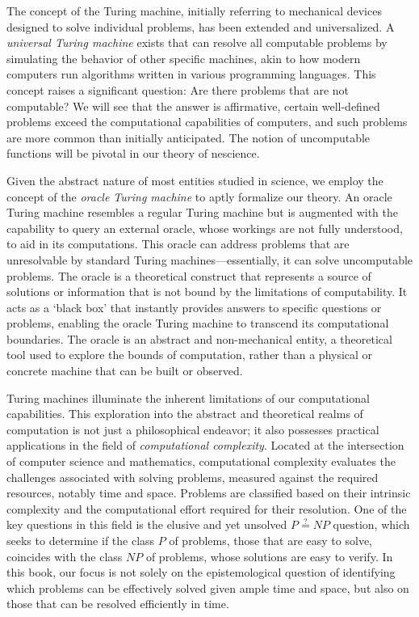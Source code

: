 The concept of the Turing machine, initially referring to mechanical devices designed to solve individual problems, has been extended and universalized. A \emph{universal Turing machine} exists that can resolve all computable problems by simulating the behavior of other specific machines, akin to how modern computers run algorithms written in various programming languages. This concept raises a significant question: Are there problems that are not computable? We will see that the answer is affirmative, certain well-defined problems exceed the computational capabilities of computers, and such problems are more common than initially anticipated. The notion of uncomputable functions will be pivotal in our theory of nescience.

Given the abstract nature of most entities studied in science, we employ the concept of the \emph{oracle Turing machine} to aptly formalize our theory. An oracle Turing machine resembles a regular Turing machine but is augmented with the capability to query an external oracle, whose workings are not fully understood, to aid in its computations. This oracle can address problems that are unresolvable by standard Turing machines—essentially, it can solve uncomputable problems. The oracle is a theoretical construct that represents a source of solutions or information that is not bound by the limitations of computability. It acts as a ‘black box’ that instantly provides answers to specific questions or problems, enabling the oracle Turing machine to transcend its computational boundaries. The oracle is an abstract and non-mechanical entity, a theoretical tool used to explore the bounds of computation, rather than a physical or concrete machine that can be built or observed.

Turing machines illuminate the inherent limitations of our computational capabilities. This exploration into the abstract and theoretical realms of computation is not just a philosophical endeavor; it also possesses practical applications in the field of \emph{computational complexity}. Located at the intersection of computer science and mathematics, computational complexity evaluates the challenges associated with solving problems, measured against the required resources, notably time and space. Problems are classified based on their intrinsic complexity and the computational effort required for their resolution. One of the key questions in this field is the elusive and yet unsolved $P\overset{?}{=}NP$ question, which seeks to determine if the class $P$ of problems, those that are easy to solve, coincides with the class $NP$ of problems, whose solutions are easy to verify. In this book, our focus is not solely on the epistemological question of identifying which problems can be effectively solved given ample time and space, but also on those that can be resolved efficiently in time.

